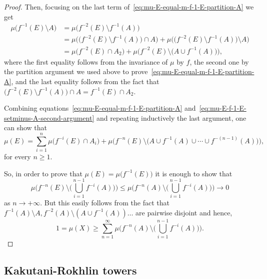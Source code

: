 \begin{proof}
  Then, focusing on the last term of~\eqref{eq:mu-E-equal-m-f-1-E-partition-A} we get
  \begin{equation}
    \label{eq:mu-E-f-1-E-setminus-A-second-argument}
    \begin{split}
      \mu\big(f^{-1}(E)\setminus A\big) &= \mu\big(f^{-2}(E)\setminus f^{-1}(A)\big) \\
                                        &= \mu\Big(\big(f^{-2}(E)\setminus f^{-1}(A)\big)\cap A \Big) + \mu\Big(\big(f^{-2}(E)\setminus f^{-1}(A))\setminus A\Big)\\
      &= \mu\big(f^{-2}(E)\cap A_{2}) + \mu\Big(f^{-2}(E)\setminus\big(A\cup f^{-1}(A)\big)\Big),
    \end{split}
  \end{equation}
  where the first equality follows from the invariance of $\mu$ by $f$, the second one by the partition argument we used above to prove~\eqref{eq:mu-E-equal-m-f-1-E-partition-A}, and the last equality follows from the fact that $\big(f^{-2}(E)\setminus f^{-1}(A)\big)\cap A = f^{-1}(E)\cap A_{2}$.

  Combining equations~\eqref{eq:mu-E-equal-m-f-1-E-partition-A} and~\eqref{eq:mu-E-f-1-E-setminus-A-second-argument} and repeating inductively the last argument, one can show that
  \begin{displaymath}
    \mu(E)= \sum_{i=1}^{n} \mu\big(f^{-i}(E)\cap A_{i}\big) + \mu\Big(f^{-n}(E)\setminus\big(A\cup f^{-1}(A)\cup\cdots\cup f^{-(n-1)}(A)\big)\Big),
  \end{displaymath}
  for every $n\geq 1$.

  So, in order to prove that $\mu(E)=\mu\big(f^{-1}(E)\big)$ it is enough to show that
  \begin{displaymath}
    \mu\bigg(f^{-n}(E) \setminus \Big(\bigcup_{i=1}^{n-1} f^{-i}(A) \Big)\bigg)\leq  \mu\bigg(f^{-n}(A) \setminus \Big(\bigcup_{i=1}^{n-1} f^{-i}(A) \Big)\bigg) \to 0
  \end{displaymath}
  as $n\to +\infty$. But this easily follows from the fact that $f^{-1}(A)\setminus A, f^{-2}(A)\setminus (A\cup f^{-1}(A))\ldots$ are pairwise disjoint and hence,
  \begin{displaymath}
    1=\mu(X) \geq \sum_{n=1}^{\infty}  \mu\bigg(f^{-n}(A) \setminus \Big(\bigcup_{i=1}^{n-1} f^{-i}(A) \Big)\bigg).
  \end{displaymath}
\end{proof}


\subsection{Kakutani-Rokhlin towers}\label{sec:Kakutani-Rokhlin-towers}

